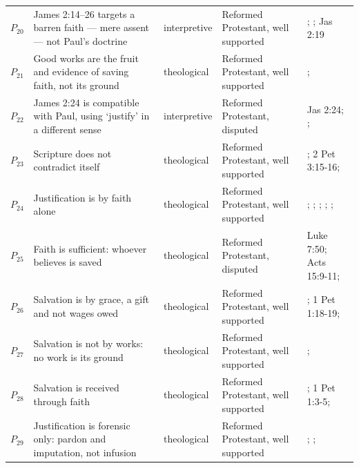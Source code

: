 \documentclass[11pt]{article}
\begin{document}
\begin{longtable}{@{}r >{\raggedright\arraybackslash}p{} l >{\raggedright\arraybackslash}p{} >{\raggedright\arraybackslash}p{}@{}}
$P_{20}$ & James 2:14–26 targets a barren faith — mere assent — not Paul's doctrine & interpretive & Reformed Protestant, well supported & \cite[ad loc. Jas 2:14]{moo-james-2000}; \cite[ad loc. Jas 2:24]{johnson-james-1995}; Jas 2:19 \\
$P_{21}$ & Good works are the fruit and evidence of saving faith, not its ground & theological & Reformed Protestant, well supported & \cite[XI.2]{westminster-confession-1647}; \cite[III.xvi.1]{calvin-institutes-1960} \\
$P_{22}$ & James 2:24 is compatible with Paul, using ‘justify’ in a different sense & interpretive & Reformed Protestant, disputed & Jas 2:24; \cite[ad loc. Jas 2:24]{moo-james-2000}; \cite[III.xvii.11]{calvin-institutes-1960} \\
$P_{23}$ & Scripture does not contradict itself & theological & Reformed Protestant, well supported & \cite[I.vii]{calvin-institutes-1960}; 2 Pet 3:15-16; \cite[ad loc. 2 Pet 3:16]{schreiner-peter-jude-2003} \\
$P_{24}$ & Justification is by faith alone & theological & Reformed Protestant, well supported & \cite[III.xi.1]{calvin-institutes-1960}; \cite{schreiner-faith-alone-2015}; \cite{mannermaa-christ-present-faith-2005}; \cite[1 Clement 32.4]{roberts-ante-nicene-fathers-1-1885}; \cite[8.6]{hilary-commentary-matthew-2013}; \cite[Homily 20, Of Humility]{basil-ascetical-works-1999} \\
$P_{25}$ & Faith is sufficient: whoever believes is saved & theological & Reformed Protestant, disputed & Luke 7:50; Acts 15:9-11; \cite{schreiner-faith-alone-2015} \\
$P_{26}$ & Salvation is by grace, a gift and not wages owed & theological & Reformed Protestant, well supported & \cite[III.xi–xviii]{calvin-institutes-1960}; 1 Pet 1:18-19; \cite[ad loc. 1 Pet 1:18]{jobes-1-peter-2005} \\
$P_{27}$ & Salvation is not by works: no work is its ground & theological & Reformed Protestant, well supported & \cite[III.xi–xviii]{calvin-institutes-1960}; \cite{schreiner-faith-alone-2015} \\
$P_{28}$ & Salvation is received through faith & theological & Reformed Protestant, well supported & \cite[III.xi–xviii]{calvin-institutes-1960}; 1 Pet 1:3-5; \cite[ad loc. 1 Pet 1:5]{jobes-1-peter-2005} \\
$P_{29}$ & Justification is forensic only: pardon and imputation, not infusion & theological & Reformed Protestant, well supported & \cite[XI.1]{westminster-confession-1647}; \cite[III.xi.2]{calvin-institutes-1960}; \cite[Epistle to Diognetus 9]{roberts-ante-nicene-fathers-1-1885} \\

\end{longtable}
\end{document}
